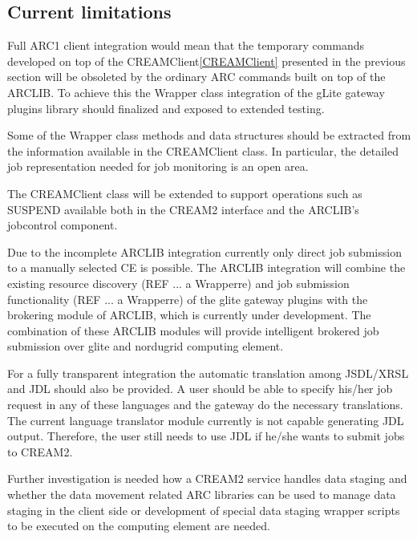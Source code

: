 \documentclass{article}
\begin{document}
\subsection{Current limitations}
\label{Current limitations}
Full ARC1 client integration would mean that the temporary commands developed on top of the CREAMClient\ref{CREAMClient} presented in the previous section will be obsoleted by the ordinary ARC commands built on top of the ARCLIB. To achieve this the Wrapper class integration of the gLite gateway plugins library should finalized and exposed to extended testing.\par
Some of the Wrapper class methods and data structures should be extracted from the information available in the CREAMClient class. In particular, the detailed job representation needed for job monitoring is an open area.\par
The CREAMClient class will be extended to support operations such as SUSPEND available both in the CREAM2 interface and the ARCLIB's jobcontrol component.\par
Due to the incomplete ARCLIB integration currently only direct job submission to a manually selected CE is possible. The ARCLIB integration will combine the existing resource discovery (REF ... a Wrapperre) and job submission functionality (REF ... a Wrapperre)  of the glite gateway plugins with the brokering module of ARCLIB, which is  currently under development. The combination of these ARCLIB modules will provide intelligent brokered job submission over glite and nordugrid computing element.\par
For a fully transparent integration the automatic translation among JSDL/XRSL and JDL should also be provided. A user should be able to specify his/her job request in any of these languages and the gateway do the necessary translations.  The current language translator module currently is not capable generating JDL output.  Therefore, the user still needs to use JDL if he/she wants to submit jobs to CREAM2.\par
Further investigation is needed how a CREAM2 service handles data staging and whether the data movement related ARC libraries can be used to manage data staging in the client side or development of special data staging wrapper scripts to be executed on the computing element are needed.
\end{document}
